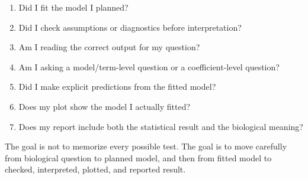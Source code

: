 \documentclass[
  letterpaper,
  8pt,
  a4paper]{book}
\providecommand{\tightlist}{%
  \setlength{\itemsep}{0pt}\setlength{\parskip}{0pt}}
\begin{document}
\begin{enumerate}
\def\labelenumi{\arabic{enumi}.}
\tightlist
\item
  Did I fit the model I planned?
\item
  Did I check assumptions or diagnostics before interpretation?
\item
  Am I reading the correct output for my question?
\item
  Am I asking a model/term-level question or a coefficient-level
  question?
\item
  Did I make explicit predictions from the fitted model?
\item
  Does my plot show the model I actually fitted?
\item
  Does my report include both the statistical result and the biological
  meaning?
\end{enumerate}

The goal is not to memorize every possible test. The goal is to move
carefully from biological question to planned model, and then from
fitted model to checked, interpreted, plotted, and reported result.


\backmatter
\end{document}
